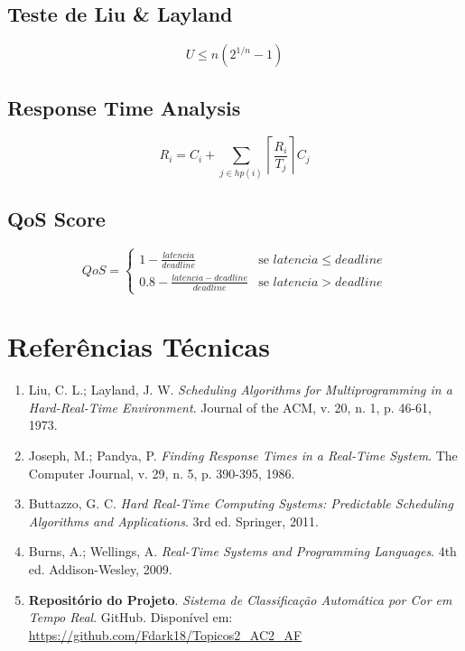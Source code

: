 \documentclass[12pt,a4paper]{article}
\begin{document}
\subsection{Teste de Liu \& Layland}
\begin{equation}
U \leq n(2^{1/n} - 1)
\end{equation}

\subsection{Response Time Analysis}
\begin{equation}
R_i = C_i + \sum_{j \in hp(i)} \left\lceil \frac{R_i}{T_j} \right\rceil C_j
\end{equation}

\subsection{QoS Score}
\begin{equation}
QoS = \begin{cases}
1 - \frac{latencia}{deadline} & \text{se } latencia \leq deadline \\
0.8 - \frac{latencia - deadline}{deadline} & \text{se } latencia > deadline
\end{cases}
\end{equation}

\section{Referências Técnicas}

\begin{enumerate}
    \item Liu, C. L.; Layland, J. W. \textit{Scheduling Algorithms for Multiprogramming in a Hard-Real-Time Environment}. Journal of the ACM, v. 20, n. 1, p. 46-61, 1973.

    \item Joseph, M.; Pandya, P. \textit{Finding Response Times in a Real-Time System}. The Computer Journal, v. 29, n. 5, p. 390-395, 1986.

    \item Buttazzo, G. C. \textit{Hard Real-Time Computing Systems: Predictable Scheduling Algorithms and Applications}. 3rd ed. Springer, 2011.

    \item Burns, A.; Wellings, A. \textit{Real-Time Systems and Programming Languages}. 4th ed. Addison-Wesley, 2009.

    \item \textbf{Repositório do Projeto}. \textit{Sistema de Classificação Automática por Cor em Tempo Real}. GitHub. Disponível em: \url{https://github.com/Fdark18/Topicos2_AC2_AF}
\end{enumerate}
\end{document}
